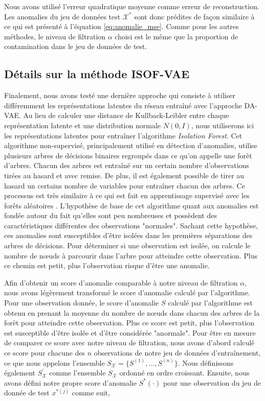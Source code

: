Nous avons utilisé l'erreur quadratique moyenne comme erreur de reconstruction. Les anomalies du jeu de données test $\mathcal{X^*}$ sont donc prédites de façon similaire à ce qui est présenté à l'équation \ref{eq:anomalie_mse}. Comme pour les autres méthodes, le niveau de filtration $\alpha$ choisi est le même que la proportion de contamination dans le jeu de données de test. 

\subsection{Détails sur la méthode ISOF-VAE} \label{isof_vae}

Finalement, nous avons testé une dernière approche qui consiste à utiliser différemment les représentations latentes du réseau entraîné avec l'approche DA-VAE. Au lieu de calculer une distance de Kullback-Leibler entre chaque représentation latente et une distribution normale $N(0,I)$, nous utiliserons ici les représentations latentes pour entraîner l'algorithme \textit{Isolation Forest}. Cet algorithme non-supervisé, principalement utilisé en détection d'anomalies, utilise plusieurs arbres de décisions binaires regroupés dans ce qu'on appelle une forêt d'arbres. Chacun des arbres est entraîné sur un certain nombre d'observations tirées au hasard et avec remise. De plus, il est également possible de tirer au hasard un certains nombre de variables pour entraîner chacun des arbres. Ce processus est très similaire à ce qui est fait en apprentissage supervisé avec les forêts aléatoires \citep{Statistics01randomforests}. L'hypothèse de base de cet algorithme quant aux anomalies est fondée autour du fait qu'elles sont peu nombreuses et possèdent des caractéristiques différentes des observations "normales". Sachant cette hypothèse, ces anomalies sont susceptibles d'être isolées dans les premières séparations des arbres de décisions. Pour déterminer si une observation est isolée, on calcule le nombre de nœuds à parcourir dans l'arbre pour atteindre cette observation. Plus ce chemin est petit, plus l'observation risque d'être une anomalie.

Afin d'obtenir un score d'anomalie comparable à notre niveau de filtration $\alpha$, nous avons légèrement transformé le score d'anomalie calculé par l'algorithme. Pour une observation donnée, le score d'anomalie $S$  calculé par l'algorithme est obtenu en prenant la moyenne du nombre de nœuds \DIFdelbegin {}\DIFdelend \DIFaddbegin {}\DIFaddend dans chacun des arbres de la forêt pour atteindre cette observation. Plus ce score est petit, plus l'observation est susceptible d'être isolée et d'être considérée "anormale". Pour être en mesure de comparer ce score avec notre niveau de filtration, nous avons d'abord calculé ce score pour chacune des $n$ observations de notre jeu de données d'entraînement, ce que nous appelons l'ensemble $S_{\mathcal{X}} = \{S^{(1)}, ..., S^{(n)}\}$. Nous définissons également $S^{'}_{\mathcal{X}}$ comme l'ensemble $S_{\mathcal{X}}$ ordonné en ordre croissant.  Ensuite, nous avons défini notre propre score d'anomalie $S^*(\cdot)$ pour une observation du jeu de donnée de test $x^{*(j)}$ comme suit,

